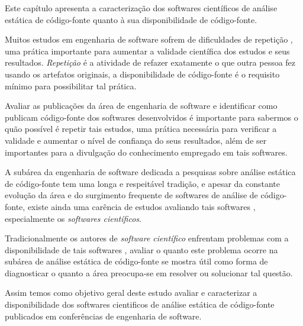 {Este capítulo apresenta a caracterização dos softwares científicos de análise
estática de código-fonte quanto à sua disponibilidade de código-fonte.}
\label{caracterizacao-ferramentas}


Muitos estudos em engenharia de software sofrem de dificuldades de repetição
\cite{Tang2016}, uma prática importante para aumentar a validade científica dos
estudos e seus resultados. {\it Repetição} é a atividade de refazer exatamente
o que outra pessoa fez usando os artefatos originais, a disponibilidade de
código-fonte é o requisito mínimo para possibilitar tal prática.

Avaliar as publicações da área de engenharia de software e identificar como
publicam código-fonte dos softwares desenvolvidos é importante para sabermos o
quão possível é repetir tais estudos, uma prática necessária para verificar a
validade e aumentar o nível de confiança do seus resultados, além de ser
importantes para a divulgação do conhecimento empregado em tais softwares.

A subárea da engenharia de software dedicada a pesquisas sobre análise estática
de código-fonte tem uma longa e respeitável tradição, e apesar da constante
evolução da área e do surgimento frequente de softwares de análise de
código-fonte, existe ainda uma carência de estudos avaliando tais softwares
\cite{Li2010}, especialmente os {\it softwares científicos}.

Tradicionalmente os autores de {\it software científico} enfrentam problemas
com a disponibilidade de tais softwares \cite{Prlic2012}, avaliar o quanto este
problema ocorre na subárea de análise estática de código-fonte se mostra
útil como forma de diagnosticar o quanto a área preocupa-se em resolver ou
solucionar tal questão.

Assim temos como objetivo geral deste estudo avaliar e caracterizar a
disponibilidade dos softwares cientificos de análise estática de código-fonte
publicados em conferências de engenharia de software.


